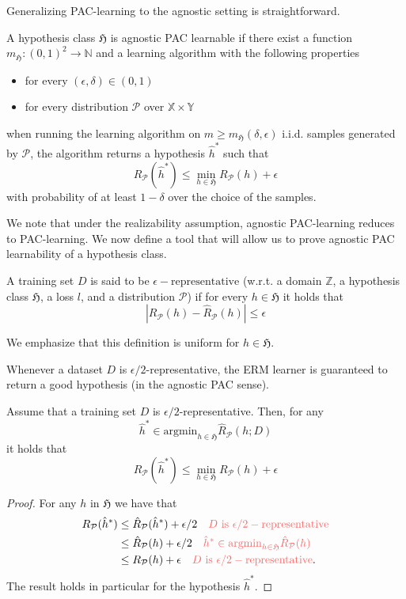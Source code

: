 Generalizing PAC-learning to the agnostic setting is straightforward.
\begin{definition}
	A hypothesis class $\mathfrak{H}$ is agnostic PAC learnable if there exist a
	function $m_\mathfrak{H}: (0,1)^2 \to \mathbb{N}$ and a learning
	algorithm with the following properties
	\begin{itemize}
		\item for every $(\epsilon, \delta) \in (0,1)$
		\item for every distribution $\mathcal{P}$ over $\mathbb{X} \times \mathbb{Y}$
	\end{itemize}
when running the learning
	algorithm on $m \geq m_\mathfrak{H}(\delta, \epsilon)$ i.i.d. samples
	generated by $\mathcal{P}$, the algorithm returns a
	hypothesis $\hat{h}^*$ such that 
	$$
	R_\mathcal{P}(\hat{h}^*) \leq \min_{h \in \mathfrak{H}} R_\mathcal{P}(h) +  \epsilon
	$$ 
	with probability of at least $1-\delta$ over the choice of the samples.
\end{definition}
We note that under the realizability assumption, agnostic PAC-learning
reduces to PAC-learning. We now define a tool that will allow us to prove
agnostic PAC learnability of a hypothesis class.
\begin{definition}
	A training set $D$ is said to be $\epsilon-\text{representative}$
	(w.r.t. a domain $\mathbb{Z}$, a hypothesis class $\mathfrak{H}$, a
	loss $l$, and a distribution $\mathcal{P}$) if for every $h \in
	\mathfrak{H}$ it holds that
	$$
	|R_\mathcal{P}(h) - \hat{R}_\mathcal{P}(h)| \leq \epsilon
	$$
\end{definition}
We emphasize that this definition is uniform for $h\in \mathfrak{H}$. 

Whenever a dataset $D$ is $\epsilon/2$-representative, the ERM learner is
guaranteed to return a good hypothesis (in the agnostic PAC sense).
\begin{thm}
Assume that a training set $D$ is $\epsilon/2$-representative. Then, for any
$$\hat{h}^* \in \text{argmin}_{h\in \mathfrak{H}} \hat{R}_{\mathcal{P}}(h;D)$$ it holds that	
$$
R_\mathcal{P}(\hat{h}^*) \leq \min_{h\in \mathfrak{H}} R_\mathcal{P}(h) +\epsilon
$$ 
\end{thm}
\begin{proof}
	For any $h$ in $\mathfrak{H}$ we have that
	\begin{align*}
		R_\mathcal{P}(\hat{h}^*) &\leq \hat{R}_\mathcal{P}(\hat{h}^*) + \epsilon/2 \quad {\color{mildred} D \text{ is }\epsilon/2- \text{representative}}\\
		&\leq \hat{R}_\mathcal{P}(h) + \epsilon/2 \quad \text{\color{mildred} $\hat{h}^* \in \text{argmin}_{h\in \mathfrak{H}} \hat{R}_\mathcal{P}(h)$}\\
		&\leq R_\mathcal{P}(h) + \epsilon \quad {\color{mildred} D \text{ is }\epsilon/2- \text{representative}}.
	\end{align*}
	The result holds in particular for the hypothesis $\hat{h}^*$.
\end{proof}

